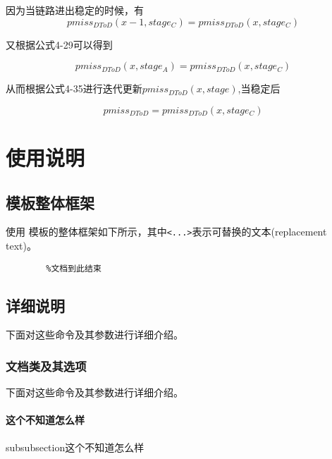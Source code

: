 \documentclass[figurelist,tablelist,algorithmlist,nomlist,masters]{seuthesix}
\begin{document}
	因为当链路进出稳定的时候，有
	\begin{equation}\label{eq3.1}
	pmis{s_{DToD}}(x - 1,stag{e_C}) = pmis{s_{DToD}}(x,stag{e_C})
	\end{equation}
	
	又根据公式4-29可以得到
	
	\begin{equation}\label{eq3.1}
	pmis{s_{DToD}}(x,stag{e_A}) = pmis{s_{DToD}}(x,stag{e_C})
	\end{equation}
	
	从而根据公式4-35进行迭代更新$pmis{s_{DToD}}(x,stage)$,当稳定后
	
	\begin{equation}\label{eq3.1}
	pmis{s_{DToD}} = pmis{s_{DToD}}(x,stag{e_C})
	\end{equation}
	

	
	\chapter{使用说明}
	
	\section{模板整体框架}
	使用 \seuthesix 模板的整体框架如下所示，其中\verb+<...>+表示可替换的文本(replacement text)。
	{\color{magenta}
		\begin{verbatim}
		%文档到此结束
		\end{verbatim}
	}
	
	\section{详细说明}
	下面对这些命令及其参数进行详细介绍。
	\subsection{文档类及其选项}
	下面对这些命令及其参数进行详细介绍。
	\subsubsection{这个不知道怎么样}
	subsubsection{这个不知道怎么样}
	
\end{document}
